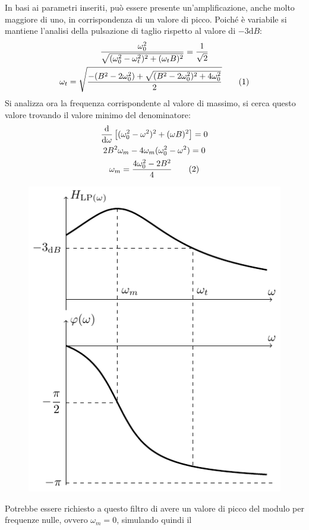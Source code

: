 \documentclass{article}
\newcommand{\df}{\mathrm{d}}
\newcommand{\tageq}{\tag{\stepcounter{equation}\theequation}}
\numberwithin{equation}{subsection}
\begin{document}
In basi ai parametri inseriti, può essere presente un'amplificazione, anche molto maggiore di uno, in corrispondenza di un valore di picco. 
Poiché è variabile si mantiene l'analisi della pulsazione di taglio rispetto al valore di $-3\df B$:
\begin{gather*}
    \displaystyle\frac{\omega_0^2}{\sqrt{(\omega_0^2-\omega_t^2)^2+(\omega_t B)^2}}=\frac{1}{\sqrt2}\\
    \omega_t=\displaystyle\sqrt{\frac{-(B^2-2\omega_0^2)+\sqrt{(B^2-2\omega_0^2)^2+4\omega_0^2}}{2}}\tageq
\end{gather*}
Si analizza ora la frequenza corrispondente al valore di massimo, si cerca questo valore trovando il valore minimo del denominatore:
\begin{gather*}
    \displaystyle\frac{\df}{\df\omega}\left[{{(\omega_0^2-\omega^2)^2+(\omega B)^2}}\right]=0\\
    2B^2\omega_m-4\omega_m(\omega_0^2-\omega^2)=0\\
    \omega_m=\displaystyle\frac{4\omega_0^2-2B^2}{4}\tageq
\end{gather*}
\begin{figure}[H]%
    \centering
    \includegraphics{passa-basso-secondo-ordine.pdf}%
\end{figure}
Potrebbe essere richiesto a questo filtro di avere un valore di picco del modulo per frequenze nulle, ovvero $\omega_m=0$, simulando quindi il 
\end{document}
